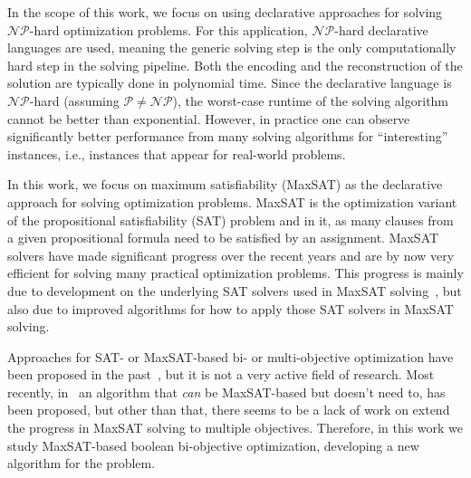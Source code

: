 In the scope of this work, we focus on using declarative approaches for solving $\mathcal{NP}$-hard optimization problems.
For this application, $\mathcal{NP}$-hard declarative languages are used, meaning the generic solving step is the only computationally hard step in the solving pipeline.
Both the encoding and the reconstruction of the solution are typically done in polynomial time.
Since the declarative language is $\mathcal{NP}$-hard (assuming $\mathcal{P}\neq\mathcal{NP}$), the worst-case runtime of the solving algorithm cannot be better than exponential.
However, in practice one can observe significantly better performance from many solving algorithms for ``interesting'' instances, i.e., instances that appear for real-world problems.

In this work, we focus on maximum satisfiability (MaxSAT) as the declarative approach for solving optimization problems.
MaxSAT is the optimization variant of the propositional satisfiability (SAT) problem and in it, as many clauses from a given propositional formula need to be satisfied by an assignment.
MaxSAT solvers have made significant progress over the recent years and are by now very efficient for solving many practical optimization problems.
This progress is mainly due to development on the underlying SAT solvers used in MaxSAT solving~\autocite{}, but also due to improved algorithms for how to apply those SAT solvers in MaxSAT solving.

Approaches for SAT- or MaxSAT-based bi- or multi-objective optimization have been proposed in the past~\autocite{DBLP:conf/cp/SohBTB17,DBLP:conf/ijcai/Terra-NevesLM18a,DBLP:conf/aaai/Terra-NevesLM18,DBLP:conf/ijcai/Terra-NevesLM18}, but it is not a very active field of research.
Most recently, in~\textcite{DBLP:conf/cp/JanotaMSM21} an algorithm that \emph{can} be MaxSAT-based but doesn't need to, has been proposed, but other than that, there seems to be a lack of work on extend the progress in MaxSAT solving to multiple objectives.
Therefore, in this work we study MaxSAT-based boolean bi-objective optimization, developing a new algorithm for the problem.

